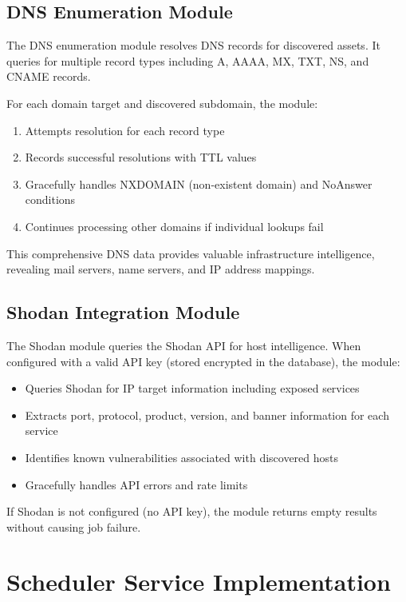 \documentclass[a4paper,12pt]{report}
\begin{document}
\subsection{DNS Enumeration Module}

The DNS enumeration module resolves DNS records for discovered assets. It queries for multiple record types including A, AAAA, MX, TXT, NS, and CNAME records.\hfill \break

For each domain target and discovered subdomain, the module:\hfill \break
\begin{enumerate}
\item Attempts resolution for each record type
\item Records successful resolutions with TTL values
\item Gracefully handles NXDOMAIN (non-existent domain) and NoAnswer conditions
\item Continues processing other domains if individual lookups fail
\end{enumerate}

This comprehensive DNS data provides valuable infrastructure intelligence, revealing mail servers, name servers, and IP address mappings.\hfill \break

\subsection{Shodan Integration Module}

The Shodan module queries the Shodan API for host intelligence. When configured with a valid API key (stored encrypted in the database), the module:

\begin{itemize}
\item Queries Shodan for IP target information including exposed services
\item Extracts port, protocol, product, version, and banner information for each service
\item Identifies known vulnerabilities associated with discovered hosts
\item Gracefully handles API errors and rate limits
\end{itemize}

If Shodan is not configured (no API key), the module returns empty results without causing job failure.\hfill \break

\section{Scheduler Service Implementation}
\end{document}
